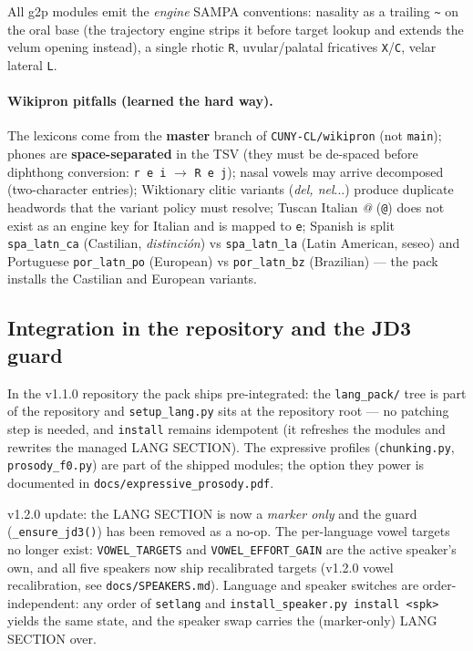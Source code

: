 \documentclass[11pt,a4paper]{article}
\newcommand{\code}[1]{\texttt{#1}}
\newcommand{\sampkey}[1]{\texttt{#1}}
\begin{document}
All g2p modules emit the \emph{engine} SAMPA conventions:
nasality as a trailing \sampkey{\textasciitilde} on the oral base
(the trajectory engine strips it before target lookup and extends the
velum opening instead), a single rhotic \sampkey{R},
uvular/palatal fricatives \sampkey{X}/\sampkey{C}, velar lateral
\sampkey{L}.

\paragraph{Wikipron pitfalls (learned the hard way).}
The lexicons come from the \textbf{master} branch of
\code{CUNY-CL/wikipron} (not \code{main}); phones are
\textbf{space-separated} in the TSV (they must be de-spaced before
diphthong conversion: \code{r e i} $\rightarrow$ \sampkey{R e j});
nasal vowels may arrive decomposed (two-character entries);
Wiktionary clitic variants (\emph{del, nel}...) produce duplicate
headwords that the variant policy must resolve; Tuscan Italian
\emph{@} (\code{@}) does not exist as an engine key for Italian and
is mapped to \sampkey{e}; Spanish is split
\code{spa\_latn\_ca} (Castilian, \emph{distinci\'on}) vs
\code{spa\_latn\_la} (Latin American, seseo) and Portuguese
\code{por\_latn\_po} (European) vs \code{por\_latn\_bz} (Brazilian)
--- the pack installs the Castilian and European variants.

\subsection{Integration in the repository and the JD3 guard}
\label{sec:guard}

In the v1.1.0 repository the pack ships pre-integrated: the
\code{lang\_pack/} tree is part of the repository and
\code{setup\_lang.py} sits at the repository root --- no patching step
is needed, and \code{install} remains idempotent (it refreshes the
modules and rewrites the managed LANG SECTION). The expressive
profiles (\code{chunking.py}, \code{prosody\_f0.py}) are part of the
shipped modules; the option they power is documented in
\code{docs/expressive\_prosody.pdf}.

v1.2.0 update: the LANG SECTION is now a \emph{marker only} and the
guard (\code{\_ensure\_jd3()}) has been removed as a no-op. The
per-language vowel targets no longer exist: \code{VOWEL\_TARGETS}
and \code{VOWEL\_EFFORT\_GAIN} are the active speaker's own, and
all five speakers now ship recalibrated targets (v1.2.0 vowel
recalibration, see \code{docs/SPEAKERS.md}). Language and speaker
switches are order-independent: any order of \code{setlang} and
\code{install\_speaker.py install <spk>} yields the same state, and
the speaker swap carries the (marker-only) LANG SECTION over.
\end{document}
